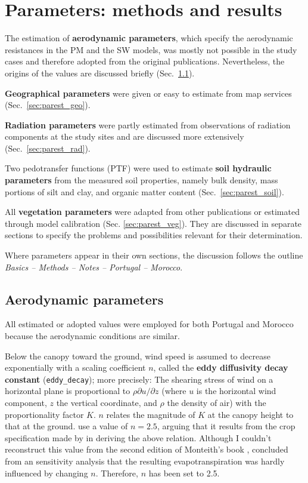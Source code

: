 \documentclass{scrreprt}
\begin{document}

\chapter{Parameters: methods and results} \label{ch:parest}

The estimation of \textbf{aerodynamic parameters}, which specify the aerodynamic resistances in the PM and the SW models, was mostly not possible in the study cases and therefore adopted from the original publications.
Nevertheless, the origins of the values are discussed briefly (Sec.~\ref{sec:parest_aero}).

\textbf{Geographical parameters} were given or easy to estimate from map services (Sec.~\ref{sec:parest_geo}).

\textbf{Radiation parameters} were partly estimated from observations of radiation components at the study sites and are discussed more extensively (Sec.~\ref{sec:parest_rad}).

Two pedotransfer functions (PTF) were used to estimate \textbf{soil hydraulic parameters} from the measured soil properties, namely bulk density, mass portions of silt and clay, and organic matter content (Sec.~\ref{sec:parest_soil}).

All \textbf{vegetation parameters} were adapted from other publications or estimated through model calibration (Sec. \ref{sec:parest_veg}).
They are discussed in separate sections to specify the problems and possibilities relevant for their determination.

Where parameters appear in their own sections, the discussion follows the outline \emph{Basics -- Methods -- Notes -- Portugal -- Morocco}.

\section{Aerodynamic parameters} \label{sec:parest_aero}

All estimated or adopted values were employed for both Portugal and Morocco because the aerodynamic conditions are similar.

Below the canopy toward the ground, wind speed is assumed to decrease exponentially with a scaling coefficient $n$, called the \textbf{eddy diffusivity decay constant} (\verb!eddy_decay!); more precisely:
The shearing stress of wind on a horizontal plane is proportional to $\rho \partial u / \partial z$ (where $u$ is the horizontal wind component, $z$ the vertical coordinate, and $\rho$ the density of air) with the proportionality factor $K$.
$n$ relates the magnitude of $K$ at the canopy height to that at the ground.
\citet{shuttleworth85} use a value of $n = 2.5$, arguing that it results from the crop specification made by \citet{monteith73} in deriving the above relation.
Although I couldn't reconstruct this value from the second edition of Monteith's book \citep{monteith90}, \citet{shuttleworth85} concluded from an sensitivity analysis that the resulting evapotranspiration was hardly influenced by changing $n$.
Therefore, $n$ has been set to 2.5.
\end{document}

